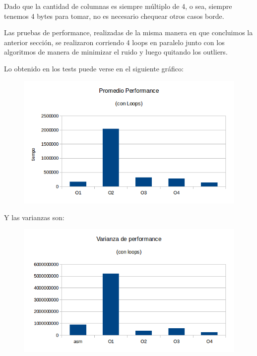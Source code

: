 \documentclass[a4paper]{article}
\begin{document}
Dado que la cantidad de columnas es siempre múltiplo de 4, o sea, siempre tenemos 4 bytes para tomar, no es necesario chequear otros casos borde.

Las pruebas de performance, realizadas de la misma manera en que concluimos la anterior sección, se realizaron corriendo 4 loops en paralelo junto con los algoritmos de manera de minimizar el ruido y luego quitando los outliers.

Lo obtenido en los tests puede verse en el siguiente gráfico:

\begin{figure}[h!]
  \begin{center}
	\includegraphics[scale=0.66]{Graficos1.4/crop/PSO.png}
	\label{nombreparareferenciar5}
  \end{center}
\end{figure}

\newpage
Y las varianzas son:

\begin{figure}[h!]
  \begin{center}
	\includegraphics[scale=0.66]{Graficos1.4/crop/VSO.png}
	\label{nombreparareferenciar6}
  \end{center}
\end{figure}
\end{document}
